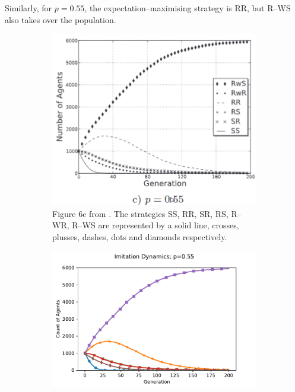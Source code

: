 \FloatBarrier
Similarly, for $p=0.55$, the expectation--maximising strategy is RR, but R--WS also takes over the population.\\
 \FloatBarrier 
\begin{figure}[!h]
  \begin{subfigure}[b]{0.45\textwidth}
    \includegraphics[width=\textwidth]{images/lotteryp055.png}
    \caption{Figure 6c from \cite{RN30}. The strategies SS, RR, SR, RS, R--WR, R--WS are represented by a solid line, crosses, plusses, dashes, dots and diamonds respectively.}
    \label{lotteryp055}
  \end{subfigure}
  \hfill
  \begin{subfigure}[b]{0.45\textwidth}
    \includegraphics[width=1.25\textwidth]{images/lotteryp055_me.pdf}

\end{subfigure}
\end{figure}
